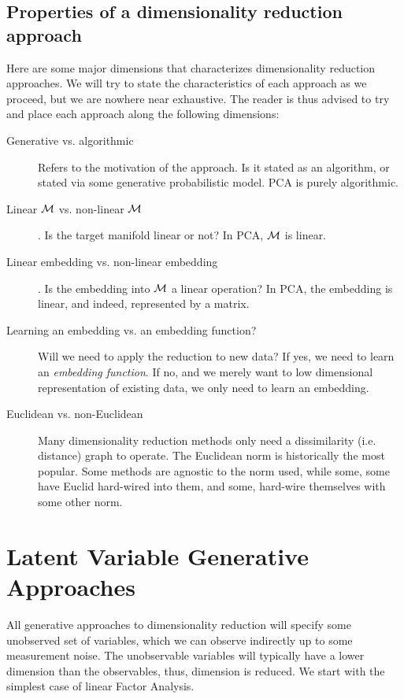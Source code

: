 \documentclass[12pt,a4paper]{article}
\begin{document}
\subsection{Properties of a dimensionality reduction approach}
Here are some major dimensions that characterizes dimensionality reduction approaches. 
We will try to state the characteristics of each approach as we proceed, but we are nowhere near exhaustive.
The reader is thus advised to try and place each approach along the following dimensions:
\begin{description}
	\item [Generative vs. algorithmic] Refers to the motivation of the approach. Is it stated as an algorithm, or stated via some generative probabilistic model. 
	PCA is purely algorithmic. 

	\item [Linear $\mathcal{M}$ vs. non-linear $\mathcal{M}$]. 
	Is the target manifold linear or not?
	In PCA, $\mathcal{M}$ is linear.

	\item [Linear embedding vs. non-linear embedding]. 
	Is the embedding into $\mathcal{M}$ a linear operation?
	In PCA, the embedding is linear, and indeed, represented by a matrix. 
	
	\item [Learning an embedding vs. an embedding function?]
	Will we need to apply the reduction to new data? 
	If yes, we need to learn an \emph{embedding function}. 
	If no, and we merely want to low dimensional representation of existing data, we only need to learn an embedding. 
	
	\item [Euclidean vs. non-Euclidean] 
	Many dimensionality reduction methods only need a dissimilarity (i.e. distance) graph to operate. 
	The Euclidean norm is historically the most popular.
	Some methods are agnostic to the norm used, while some, some have Euclid hard-wired into them, and some, hard-wire themselves with some other norm. 
	
\end{description}





\section{Latent Variable Generative Approaches}
All generative approaches to dimensionality reduction will specify some unobserved set of variables, which we can observe indirectly up to some measurement noise. 
The unobservable variables will typically have a lower dimension than the observables, thus, dimension is reduced. 
We start with the simplest case of linear Factor Analysis. 
\end{document}
